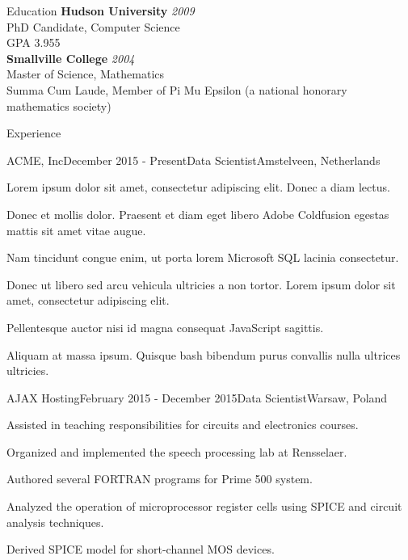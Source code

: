 \documentclass{resume}
\begin{document}
\begin{rSection}{Education}
    {\bf Hudson University} \hfill {\em 2009} \\ 
    { PhD Candidate}, { Computer Science } \\
            GPA 3.955
    \smallskip\\
    {\bf Smallville College} \hfill {\em 2004} \\ 
    { Master of Science}, { Mathematics } \\
            Summa Cum Laude, Member of Pi Mu Epsilon (a national
            honorary mathematics society)
    
\end{rSection}

\begin{rSection}{Experience}
\begin{rSubsection}{ACME, Inc}{December 2015 - Present}{Data
Scientist}{Amstelveen, Netherlands}
\item Lorem ipsum dolor sit amet, consectetur adipiscing elit. Donec a
diam lectus.
\item Donec et mollis dolor. Praesent et diam eget libero Adobe
Coldfusion egestas mattis sit amet vitae augue.
\item Nam tincidunt congue enim, ut porta lorem Microsoft SQL lacinia
consectetur.
\item Donec ut libero sed arcu vehicula ultricies a non tortor. Lorem
ipsum dolor sit amet, consectetur adipiscing elit.
\item Pellentesque auctor nisi id magna consequat JavaScript sagittis.
\item Aliquam at massa ipsum. Quisque bash bibendum purus convallis
nulla ultrices ultricies.
\end{rSubsection}
\begin{rSubsection}{AJAX Hosting}{February 2015 - December 2015}{Data
Scientist}{Warsaw, Poland}
\item Assisted in teaching responsibilities for circuits and electronics
courses.
\item Organized and implemented the speech processing lab at Rensselaer.
\item Authored several FORTRAN programs for Prime 500 system.
\item Analyzed the operation of microprocessor register cells using
SPICE and circuit analysis techniques.
\item Derived SPICE model for short-channel MOS devices.
\end{rSubsection}
\end{rSection}
\end{document}
